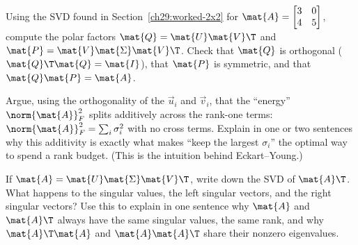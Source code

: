 \begin{exercise}
\label{ch29:ex-polar}
Using the SVD found in Section~\ref{ch29:worked-2x2} for
$\mat{A} = \begin{bmatrix} 3 & 0 \\ 4 & 5\end{bmatrix}$, compute the polar
factors $\mat{Q} = \mat{U}\mat{V}\T$ and $\mat{P} = \mat{V}\mat{\Sigma}\mat{V}\T$.
Check that $\mat{Q}$ is orthogonal ($\mat{Q}\T\mat{Q} = \mat{I}$), that $\mat{P}$
is symmetric, and that $\mat{Q}\mat{P} = \mat{A}$.
\end{exercise}

\begin{exercise}
\label{ch29:ex-greedy}
Argue, using the orthogonality of the $\vec{u}_i$ and $\vec{v}_i$, that the
``energy'' $\norm{\mat{A}}_F^2$ splits additively across the rank-one terms:
$\norm{\mat{A}}_F^2 = \sum_i \sigma_i^2$ with no cross terms. Explain in one or
two sentences why this additivity is exactly what makes ``keep the largest
$\sigma_i$'' the optimal way to spend a rank budget. (This is the intuition behind
Eckart--Young.)
\end{exercise}

\begin{exercise}
\label{ch29:ex-transpose}
If $\mat{A} = \mat{U}\mat{\Sigma}\mat{V}\T$, write down the SVD of $\mat{A}\T$.
What happens to the singular values, the left singular vectors, and the right
singular vectors? Use this to explain in one sentence why $\mat{A}$ and
$\mat{A}\T$ always have the same singular values, the same rank, and why
$\mat{A}\T\mat{A}$ and $\mat{A}\mat{A}\T$ share their nonzero eigenvalues.
\end{exercise}

